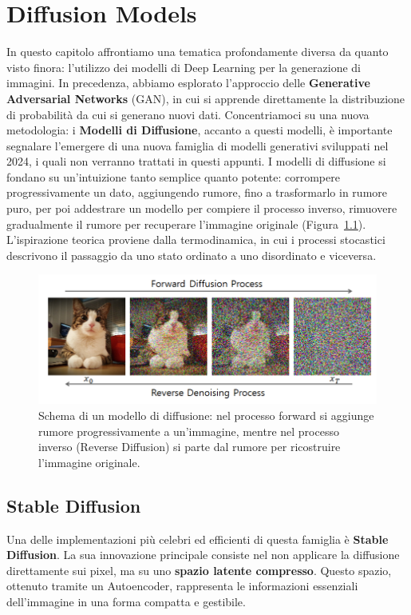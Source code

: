 \chapter{Diffusion Models}\label{cap:15}

In questo capitolo affrontiamo una tematica profondamente diversa da quanto visto finora: l’utilizzo dei modelli di Deep Learning per la generazione di immagini. In precedenza, abbiamo esplorato l'approccio delle \textbf{Generative Adversarial Networks} (GAN), in cui si apprende direttamente la distribuzione di probabilità da cui si generano nuovi dati. Concentriamoci su una nuova metodologia: i \textbf{Modelli di Diffusione}, accanto a questi modelli, è importante segnalare l’emergere di una nuova famiglia di modelli generativi sviluppati nel 2024, i quali non verranno trattati in questi appunti. I modelli di diffusione si fondano su un'intuizione tanto semplice quanto potente: corrompere progressivamente un dato, aggiungendo rumore, fino a trasformarlo in rumore puro, per poi addestrare un modello per compiere il processo inverso, rimuovere gradualmente il rumore per recuperare l’immagine originale (Figura~\ref{fig:diffMod}). L’ispirazione teorica proviene dalla termodinamica, in cui i processi stocastici descrivono il passaggio da uno stato ordinato a uno disordinato e viceversa.
\begin{figure}[hbtp]
    \centering
    \includegraphics[width=\textwidth]{figure/diffusionModel}
    \caption{Schema di un modello di diffusione: nel processo forward si aggiunge rumore progressivamente a un’immagine, mentre nel processo inverso (Reverse Diffusion) si parte dal rumore per ricostruire l’immagine originale.}
    \label{fig:diffMod}
\end{figure}

\section{Stable Diffusion}
Una delle implementazioni più celebri ed efficienti di questa famiglia è \textbf{Stable Diffusion}. La sua innovazione principale consiste nel non applicare la diffusione direttamente sui pixel, ma su uno \textbf{spazio latente compresso}. Questo spazio, ottenuto tramite un Autoencoder, rappresenta le informazioni essenziali dell’immagine in una forma compatta e gestibile.

